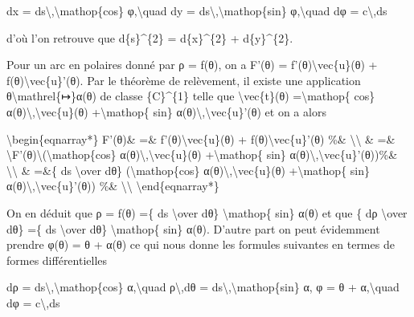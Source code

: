 \documentclass[]{article}
\begin{document}
dx = ds\textbackslash{},\textbackslash{}mathop\{cos\}
φ,\textbackslash{}quad dy =
ds\textbackslash{},\textbackslash{}mathop\{sin\} φ,\textbackslash{}quad
dφ = c\textbackslash{},ds

d'où l'on retrouve que d\{s\}\^{}\{2\} = d\{x\}\^{}\{2\} +
d\{y\}\^{}\{2\}.

Pour un arc en polaires donné par ρ = f(θ), on a F'(θ) =
f'(θ)\textbackslash{}vec\{u\}(θ) + f(θ)\textbackslash{}vec\{u\}'(θ). Par
le théorème de relèvement, il existe une application
θ\textbackslash{}mathrel\{↦\}α(θ) de classe \{C\}\^{}\{1\} telle que
\textbackslash{}vec\{t\}(θ) =\textbackslash{}mathop\{ cos\}
α(θ)\textbackslash{},\textbackslash{}vec\{u\}(θ)
+\textbackslash{}mathop\{ sin\}
α(θ)\textbackslash{},\textbackslash{}vec\{u\}'(θ) et on a alors

\textbackslash{}begin\{eqnarray*\} F'(θ)\& =\&
f'(θ)\textbackslash{}vec\{u\}(θ) + f(θ)\textbackslash{}vec\{u\}'(θ) \%\&
\textbackslash{}\textbackslash{} \& =\&
\textbackslash{}\textbar{}F'(θ)\textbackslash{}\textbar{}(\textbackslash{}mathop\{cos\}
α(θ)\textbackslash{},\textbackslash{}vec\{u\}(θ)
+\textbackslash{}mathop\{ sin\}
α(θ)\textbackslash{},\textbackslash{}vec\{u\}'(θ))\%\&
\textbackslash{}\textbackslash{} \& =\&\{ ds \textbackslash{}over dθ\}
(\textbackslash{}mathop\{cos\}
α(θ)\textbackslash{},\textbackslash{}vec\{u\}(θ)
+\textbackslash{}mathop\{ sin\}
α(θ)\textbackslash{},\textbackslash{}vec\{u\}'(θ)) \%\&
\textbackslash{}\textbackslash{} \textbackslash{}end\{eqnarray*\}

On en déduit que ρ = f(θ) =\{ ds \textbackslash{}over dθ\}
\textbackslash{}mathop\{ sin\} α(θ) et que \{ dρ \textbackslash{}over
dθ\} =\{ ds \textbackslash{}over dθ\} \textbackslash{}mathop\{ sin\}
α(θ). D'autre part on peut évidemment prendre φ(θ) = θ + α(θ) ce qui
nous donne les formules suivantes en termes de formes différentielles

dρ = ds\textbackslash{},\textbackslash{}mathop\{cos\}
α,\textbackslash{}quad ρ\textbackslash{},dθ =
ds\textbackslash{},\textbackslash{}mathop\{sin\} α, φ = θ +
α,\textbackslash{}quad dφ = c\textbackslash{},ds
\end{document}
